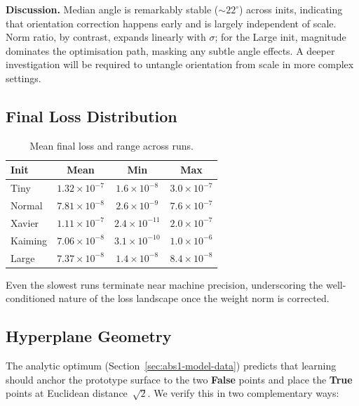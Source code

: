 \textbf{Discussion.}  
Median angle is remarkably stable ($\sim22^\circ$) across inits, indicating
that orientation correction happens early and is largely independent of scale.
Norm ratio, by contrast, expands linearly with $\sigma$; for the Large init,
magnitude dominates the optimisation path, masking any subtle angle effects.
A deeper investigation will be required to untangle orientation from scale in
more complex settings.

\subsection*{Final Loss Distribution}

\begin{table}[h]
\centering
\caption{Mean final loss and range across runs.}
\label{tab:init-loss}
\begin{tabular}{lccc}
\toprule
Init & Mean & Min & Max \\
\midrule
Tiny    & $1.32\times10^{-7}$ & $1.6\times10^{-8}$ & $3.0\times10^{-7}$ \\
Normal  & $7.81\times10^{-8}$ & $2.6\times10^{-9}$ & $7.6\times10^{-7}$ \\
Xavier  & $1.11\times10^{-7}$ & $2.4\times10^{-11}$ & $2.0\times10^{-7}$ \\
Kaiming & $7.06\times10^{-8}$ & $3.1\times10^{-10}$ & $1.0\times10^{-6}$ \\
Large   & $7.37\times10^{-8}$ & $1.4\times10^{-8}$ & $8.4\times10^{-8}$ \\
\bottomrule
\end{tabular}
\end{table}

Even the slowest runs terminate near machine precision, underscoring the
well-conditioned nature of the loss landscape once the weight norm is
corrected.

\subsection*{Hyperplane Geometry}
\label{sec:init-geometry}

The analytic optimum (Section~\ref{sec:abs1-model-data}) predicts that learning
should anchor the prototype surface to the two \textbf{False} points
and place the \textbf{True} points at Euclidean distance~$\sqrt2$.
We verify this in two complementary ways:


